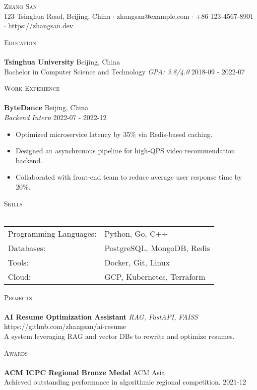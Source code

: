 \documentclass[a4paper]{article}
\newcommand{\lineunder} {
    \vspace*{-8pt} \\
    \hspace*{-18pt} \hrulefill \\
}
\newcommand{\header} [1] {
    {\hspace*{-18pt}\vspace*{6pt} \textsc{#1}}
    \vspace*{-6pt} \lineunder
}
\begin{document}
\vspace*{-40pt}


\vspace*{-10pt}
\begin{center}
  {\Huge \scshape {Zhang San}}\\
   123 Tsinghua Road, Beijing, China $\cdot$    zhangsan@example.com $\cdot$    +86 123{-}4567{-}8901 $\cdot$    https://zhangsan.dev \
\end{center}


\header{Education}
 \textbf{Tsinghua University}  
 \hfill Beijing, China \\
 Bachelor   in Computer Science and Technology   \textit{GPA: 3.8/4.0} \hfill
 2018{-}09 -  2022{-}07 \\
\vspace{2mm}



\header{Work Experience}
\vspace{1mm}
 \textbf{ByteDance}  
 \hfill Beijing, China \\
 \textit{Backend Intern}  
\hfill
 2022{-}07 -  2022{-}12 \\
\vspace{-1mm}
\begin{itemize} \itemsep 1pt
    \item Optimized microservice latency by 35\% via Redis{-}based caching.
    \item Designed an asynchronous pipeline for high{-}QPS video recommendation backend.
    \item Collaborated with front{-}end team to reduce average user response time by 20\%.
\end{itemize}




\header{Skills}
\begin{tabular}{ l l }
	    Programming Languages: & Python, Go, C++\\
        Databases: & PostgreSQL, MongoDB, Redis\\
        Tools: & Docker, Git, Linux\\
        Cloud: & GCP, Kubernetes, Terraform\\
    \end{tabular}
\vspace{2mm}


\header{Projects}
 {\textbf{AI Resume Optimization Assistant}} {\sl RAG, FastAPI, FAISS } 
\hfill 
 https://github.com/zhangsan/ai{-}resume \\
 A system leveraging RAG and vector DBs to rewrite and optimize resumes. \\
\vspace*{2mm}



\header{Awards}
\textbf{ACM ICPC Regional Bronze Medal}\hfill
ACM Asia \\
Achieved outstanding performance in algorithmic regional competition.\hfill
2021{-}12\\
\vspace*{2mm}
\end{document}
